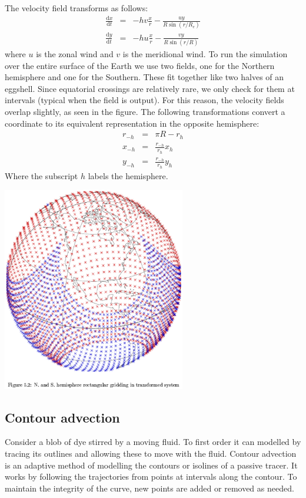 The velocity field transforms as follows:
\begin{eqnarray}
\frac{\mathrm d x}{\mathrm d t} & = & - h v \frac{x}{r} - 
		\frac{u y}{R \sin (r/R_e)} \\
\frac{\mathrm d y}{\mathrm d t} & = & - h u \frac{x}{r} - 
		\frac{v y}{R \sin (r/R)}
\end{eqnarray}
where $u$ is the zonal wind and $v$ is the meridional wind.
To run the simulation over the entire surface of the Earth
we use two fields, one for the Northern hemisphere and one for the Southern.
These fit together like two halves of an eggshell.
Since equatorial crossings are relatively rare, 
we only check for them at intervals (typical when the field is output).
For this reason, the velocity fields overlap slightly, as seen in the figure.
The following transformations convert a coordinate to its equivalent
representation in the opposite hemisphere:
\begin{eqnarray}
r_{-h} & = & \pi R - r_h \\
x_{-h} & = & \frac {r_{-h} } 
	{r_h} x_h \\
y_{-h} & = & \frac {r_{-h} } 
	{r_h} y_h
\end{eqnarray}
Where the subscript $h$ labels the hemisphere.

\begin{center}
\includegraphics[width=0.6\textwidth]{tracer_coord.ps}
\end{center}

\subsection{Contour advection}

Consider a blob of dye stirred by a moving fluid.
To first order it can modelled by tracing its outlines
and allowing these to move with the fluid.
Contour advection is an adaptive method of modelling the
contours or isolines of a passive tracer.
It works by following the trajectories from points at intervals along
the contour.  
To maintain the integrity of the curve,
new points are added or removed as needed.

